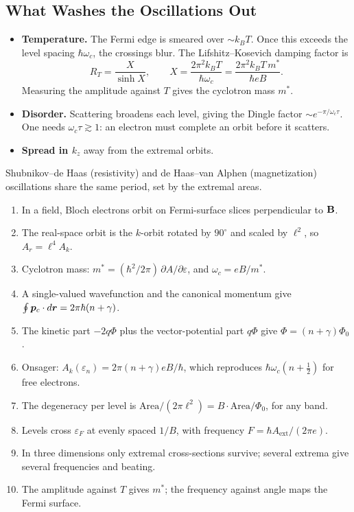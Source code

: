 \subsection{What Washes the Oscillations Out}

\begin{itemize}
    \item \textbf{Temperature.} The Fermi edge is smeared over $\sim k_BT$. Once this exceeds the level spacing $\hbar\omega_c$, the crossings blur. The Lifshitz--Kosevich damping factor is
    \begin{equation}
        R_T = \frac{X}{\sinh X}, \qquad X = \frac{2\pi^2k_BT}{\hbar\omega_c} = \frac{2\pi^2k_BT\,m^*}{\hbar eB}.
    \end{equation}
    Measuring the amplitude against $T$ gives the cyclotron mass $m^*$.
    \item \textbf{Disorder.} Scattering broadens each level, giving the Dingle factor $\sim e^{-\pi/\omega_c\tau}$. One needs $\omega_c\tau\gtrsim1$: an electron must complete an orbit before it scatters.
    \item \textbf{Spread in $k_z$} away from the extremal orbits.
\end{itemize}

Shubnikov--de Haas (resistivity) and de Haas--van Alphen (magnetization) oscillations share the same period, set by the extremal areas.

\begin{fact}
\begin{enumerate}
    \item In a field, Bloch electrons orbit on Fermi-surface slices perpendicular to $\cvect{B}$.
    \item The real-space orbit is the $k$-orbit rotated by $90^\circ$ and scaled by $\ell^2$, so $A_r = \ell^4A_k$.
    \item Cyclotron mass: $m^* = (\hbar^2/2\pi)\,\partial A/\partial\varepsilon$, and $\omega_c = eB/m^*$.
    \item A single-valued wavefunction and the canonical momentum give $\oint\bm{p}_c\cdot d\bm{r} = 2\pi\hbar(n+\gamma)$.
    \item The kinetic part $-2q\Phi$ plus the vector-potential part $q\Phi$ give $\Phi = (n+\gamma)\Phi_0$.
    \item Onsager: $A_k(\varepsilon_n) = 2\pi(n+\gamma)eB/\hbar$, which reproduces $\hbar\omega_c(n+\tfrac12)$ for free electrons.
    \item The degeneracy per level is $\text{Area}/(2\pi\ell^2) = B\cdot\text{Area}/\Phi_0$, for any band.
    \item Levels cross $\varepsilon_F$ at evenly spaced $1/B$, with frequency $F = \hbar A_{\text{ext}}/(2\pi e)$.
    \item In three dimensions only extremal cross-sections survive; several extrema give several frequencies and beating.
    \item The amplitude against $T$ gives $m^*$; the frequency against angle maps the Fermi surface.
\end{enumerate}
\end{fact}

